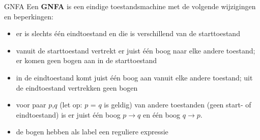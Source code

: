 \begin{theo}[GNFA]{GNFA}
    Een \textbf{GNFA} is een eindige toestandsmachine met de volgende wijzigingen en beperkingen: \\

    \begin{minipage}{.56\textwidth}
        \begin{itemize}
            \item er is slechts één eindtoestand en die is verschillend van de starttoestand
            \item vanuit de starttoestand vertrekt er juist één boog naar elke andere toestand; er komen geen bogen aan in de starttoestand
            \item in de eindtoestand komt juist één boog aan vanuit elke andere toestand; uit de eindtoestand vertrekken geen bogen
            \item voor paar \(p\),\(q\) (let op: \(p\) = \(q\) is geldig) van andere toestanden (geen start- of eindtoestand) is er juist één boog \(p \to q\) en één boog \(q \to p\).
            \item  de bogen hebben als label een reguliere expressie
        \end{itemize} 
    \end{minipage}
    \hspace{0.1cm}
    \begin{minipage}{.4\textwidth}

\end{minipage}
\end{theo}
